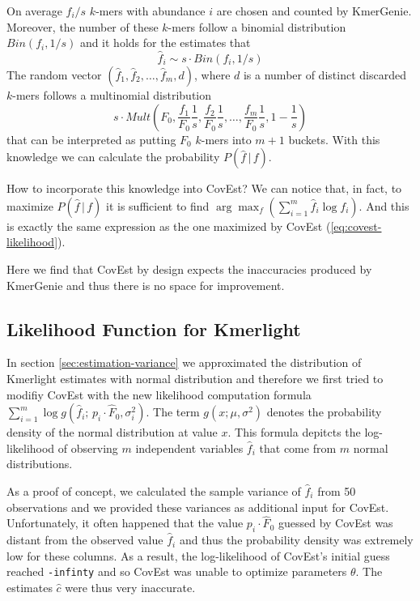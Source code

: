 On average $f_i / s$ $k$-mers with abundance $i$ are chosen and counted by KmerGenie.
Moreover, the number of these $k$-mers follow a binomial distribution $Bin(f_i, 1/s)$
and it holds for the estimates that
$$\hat f_i \sim s \cdot Bin(f_i, 1/s)$$
The random vector $(\hat f_1, \hat f_2, \dots, \hat f_m, d)$, where $d$ is a number
of distinct discarded $k$-mers follows a multinomial distribution 
$$s \cdot Mult\left(F_0, \frac{f_1}{F_0} \frac{1}{s}, \frac{f_2}{F_0} \frac{1}{s}, \dots, 
\frac{f_m}{F_0} \frac{1}{s}, 1-\frac{1}{s}\right)$$
that can be interpreted as putting $F_0$ $k$-mers into $m+1$ buckets. With this knowledge we can
calculate the probability $P(\hat f\,|\,f)$.

\medskip

How to incorporate this knowledge into CovEst? We can notice that, in fact, to maximize 
$P(\hat f\,|\,f)$ it is sufficient to find $\arg \max_f \left(\sum_{i=1}^m \hat f_i \log f_i
\right)$. And this is exactly the same expression as the one maximized by CovEst 
(\ref{eq:covest-likelihood}).

Here we find that CovEst by design expects the inaccuracies produced by KmerGenie
and thus there is no space for improvement.




\subsection{Likelihood Function for Kmerlight}
In section \ref{sec:estimation-variance} we approximated the distribution of Kmerlight
estimates with normal distribution and therefore
we first tried to modifiy CovEst with the new likelihood computation formula 
$\sum_{i=1}^m \log g(\hat f_i;\, p_i \cdot \hat F_0, \sigma_i^2)$. The term $g(x; \mu, \sigma^2)$  
denotes the probability density of the normal distribution at value $x$. This formula depitcts the
log-likelihood of observing $m$ independent variables $\hat f_i$ that come from $m$
normal distributions.

As a proof of concept, we calculated the sample variance of $\hat f_i$ from 50 observations 
and we provided these variances as additional input for CovEst.
Unfortunately, it often happened that the value $p_i \cdot \hat F_0$ guessed by CovEst was distant
from the observed value $\hat f_i$ and thus the probability density was extremely low for these
columns. As a result, the log-likelihood of CovEst's initial guess reached \texttt{-infinty} 
and so CovEst was unable to optimize parameters $\theta$. The estimates $\hat c$ 
were thus very inaccurate.

